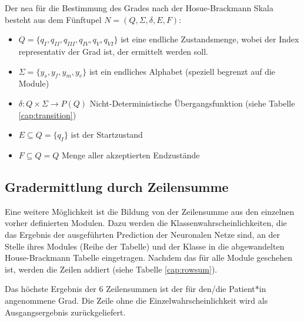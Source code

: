 Der \ac{nea} für die Bestimmung des Grades nach der Hosue-Brackmann Skala besteht aus dem Fünftupel $N = (Q, \Sigma, \delta, E, F)$:

\begin{itemize}
  \setlength\itemsep{-0.5em}
\item $Q=\{ q_I, q_{II}, q_{III}, q_{IV}, q_{V}, q_{VI} \}$  ist eine endliche Zustandsmenge, wobei der Index representativ der Grad ist, der ermittelt werden soll.
\item $\Sigma=\{ y_s, y_f, y_m, y_e \}$ ist ein endliches Alphabet (speziell begrenzt auf die Module)
\item $\delta:Q \times \Sigma \rightarrow P(Q)$ Nicht-Deterministische Übergangsfunktion (siehe Tabelle \ref{cap:transition})
\item $E \subseteq Q = \{ q_I \}$ ist der Startzustand
\item $F \subseteq Q = Q$ Menge aller akzeptierten Endzustände
\end{itemize}





\subsection{Gradermittlung durch Zeilensumme}\label{rowsum}
Eine weitere Möglichkeit ist die Bildung von der Zeilensumme aus den einzelnen vorher definierten Modulen. Dazu werden die Klassenwahrscheinlichkeiten, die das Ergebnis der ausgeführten Prediction der Neuronalen Netze sind, an der Stelle ihres Modules (Reihe der Tabelle) und der Klasse in die abgewandelten House-Brackmann Tabelle eingetragen. Nachdem das für alle Module geschehen ist, werden die Zeilen addiert (siehe Tabelle \ref{cap:rowsum}).

Das höchste Ergebnis der 6 Zeilensummen ist der für den/die Patient*in angenommene Grad. Die Zeile ohne die Einzelwahrscheinlichkeit wird als Ausgangsergebnis zurückgeliefert.

